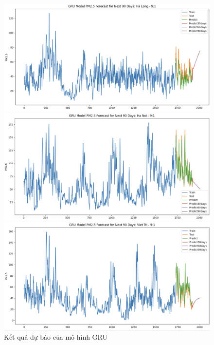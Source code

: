 \begin{figure}[H]
    \begin{minipage}{0.15\textwidth}
        \centering
        \includegraphics[width=1\textwidth, height=0.6\textwidth]{img/final/GRU/90D/GRU_9_1_HL.png}
        \end{minipage}
        \hfill
        \begin{minipage}{0.15\textwidth}
        \centering
        \includegraphics[width=1\textwidth, height=0.6\textwidth]{img/final/GRU/90D/GRU_9_1_HN.png}
        \end{minipage}
        \hfill
        \begin{minipage}{0.15\textwidth}
        \centering
        \includegraphics[width=1\textwidth, height=0.6\textwidth]{img/final/GRU/90D/GRU_9_1_VT.png}
        \end{minipage}
        \hfill
    
    \caption{Kết quả dự báo của mô hình GRU}
    \label{fig:GRU}
    
\end{figure}
